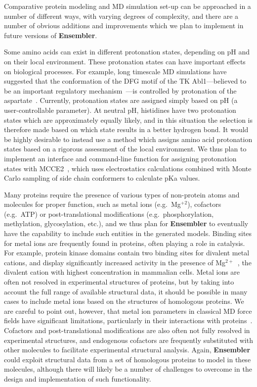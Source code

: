 \documentclass[aps,prl,preprint,nofootinbib,superscriptaddress,linenumbers]{revtex4-1}
\begin{document}
Comparative protein modeling and MD simulation set-up can be approached in a number of different ways, with varying degrees of complexity, and there are a number of obvious additions and improvements which we plan to implement in future versions of {\bf Ensembler}.

Some amino acids can exist in different protonation states, depending on pH and on their local environment.
These protonation states can have important effects on biological processes.
For example, long timescale MD simulations have suggested that the conformation of the DFG motif of the TK Abl1---believed to be an important regulatory mechanism~\cite{nagar:cell:2003:abl-1opl}---is controlled by protonation of the aspartate~\cite{shan:pnas:2009:abl}.
Currently, protonation states are assigned simply based on pH (a user-controllable parameter).
At neutral pH, histidines have two protonation states which are approximately equally likely, and in this situation the selection is therefore made based on which state results in a better hydrogen bond.
It would be highly desirable to instead use a method which assigns amino acid protonation states based on a rigorous assessment of the local environment.
We thus plan to implement an interface and command-line function for assigning protonation states with MCCE2~\cite{alexov-gunner:biophys-j:1997:mcce2,georgescu-alexov-gunner:biophys-j:2002:mcce2,song-mao-gunner:j-comput-chem:2009:mcce2}, which uses electrostatics calculations combined with Monte Carlo sampling of side chain conformers to calculate pKa values.

Many proteins require the presence of various types of non-protein atoms and molecules for proper function, such as metal ions (e.g.~Mg$^{+2}$), cofactors (e.g.~ATP) or post-translational modifications (e.g.~phosphorylation, methylation, glycosylation, etc.), and we thus plan for {\bf Ensembler} to eventually have the capability to include such entities in the generated models.
Binding sites for metal ions are frequently found in proteins, often playing a role in catalysis.
For example, protein kinase domains contain two binding sites for divalent metal cations, and display significantly increased activity in the presence of Mg$^{2+}$~\cite{adams:prot-sci:1993:kinase-metal-ions}, the divalent cation with highest concentration in mammalian cells.
Metal ions are often not resolved in experimental structures of proteins, but by taking into account the full range of available structural data, it should be possible in many cases to include metal ions based on the structures of homologous proteins.
We are careful to point out, however, that metal ion parameters in classical MD force fields have significant limitations, particularly in their interactions with proteins~\cite{sousa:book:2010:metal-ion-parameters-difficulties}.
Cofactors and post-translational modifications are also often not fully resolved in experimental structures, and endogenous cofactors are frequently substituted with other molecules to facilitate experimental structural analysis.
Again, {\bf Ensembler} could exploit structural data from a set of homologous proteins to model in these molecules, although there will likely be a number of challenges to overcome in the design and implementation of such functionality.
\end{document}
